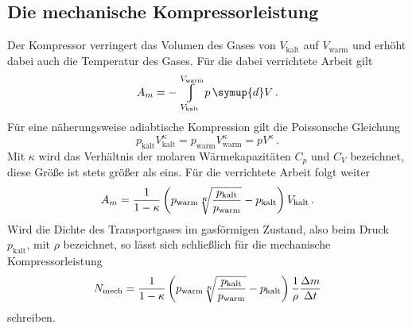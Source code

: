 \subsection{Die mechanische Kompressorleistung}
Der Kompressor verringert das Volumen des Gases von $V_\text{kalt}$ auf $V_\text{warm}$
und erhöht dabei auch die Temperatur des Gases. Für die dabei verrichtete Arbeit gilt
\begin{equation}
  A_m = - \displaystyle\varint\displaylimits_{V_\text{kalt}}^{V_\text{warm}} p \, \symup{d}V\,.
  \label{eqn:arbeitkompressor1}
\end{equation}
Für eine näherungsweise adiabtische Kompression gilt die Poissonsche Gleichung
\begin{equation}
  p_\text{kalt} V_\text{kalt}^{\kappa} = p_\text{warm} V_\text{warm}^{\kappa} = p V^{\kappa}\,.
  \label{eqn:poisson}
\end{equation}
Mit $\kappa$ wird das Verhältnis der molaren Wärmekapazitäten $C_p$ und $C_V$
bezeichnet, diese Größe ist stets größer als eins.
Für die verrichtete Arbeit folgt weiter
\begin{equation}
  A_m = \frac{1}{1 - \kappa} \left(p_\text{warm} \sqrt[\leftroot{-1}\uproot{-1}\scriptstyle \kappa]{\frac{p_\text{kalt}}{p_\text{warm}}} - p_\text{kalt} \right) V_\text{kalt}\,.
  \label{eqn:arbeitkompressor2}
\end{equation}
Wird die Dichte des Transportgases im gasförmigen Zustand, also beim Druck $p_\text{kalt}$,
mit $\rho$ bezeichnet, so lässt sich schließlich für die mechanische Kompressorleistung
\begin{equation}
  N_\text{mech} = \frac{1}{1 - \kappa} \left(p_\text{warm} \sqrt[\leftroot{-1}\uproot{-1}\scriptstyle \kappa]{\frac{p_\text{kalt}}{p_\text{warm}}} - p_\text{kalt} \right) \frac{1}{\rho} \frac{\Delta m}{\Delta t}
  \label{eqn:kompressorleistung}
\end{equation}
schreiben.
